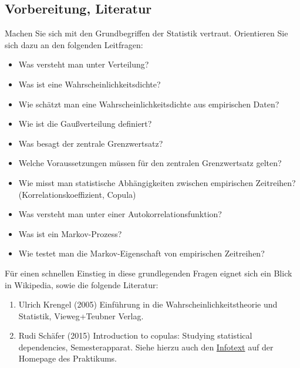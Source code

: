 \documentclass[a4paper,10pt]{article}
\begin{document}



\subsection{Vorbereitung, Literatur}

Machen Sie sich mit den Grundbegriffen der Statistik vertraut. 
Orientieren Sie sich dazu an den folgenden Leitfragen:
\begin{itemize}
\item Was versteht man unter Verteilung? 
\item Was ist eine Wahrscheinlichkeitsdichte?
\item Wie schätzt man eine Wahrscheinlichkeitsdichte aus empirischen Daten?
\item Wie ist die Gaußverteilung definiert?
\item Was besagt der zentrale Grenzwertsatz? 
\item Welche Voraussetzungen müssen für den zentralen Grenzwertsatz gelten?
\item Wie misst man statistische Abhängigkeiten zwischen empirischen Zeitreihen?
      (Korrelationskoeffizient, Copula)
\item Was versteht man unter einer Autokorrelationsfunktion?
\item Was ist ein Markov-Prozess?
\item Wie testet man die Markov-Eigenschaft von empirischen Zeitreihen?
\end{itemize}

\vspace*{1cm}
Für einen schnellen Einstieg in diese grundlegenden Fragen eignet sich ein Blick in Wikipedia, sowie die folgende Literatur:

\begin{enumerate}
\item Ulrich Krengel (2005) Einführung in die Wahrscheinlichkeitstheorie und Statistik, Vieweg+Teubner Verlag.
\item Rudi Schäfer (2015) Introduction to copulas: Studying statistical dependencies, Semesterapparat. Siehe hierzu auch den \href{https://aglorke.uni-due.de/fp2/info/For\%20experiment\%201.12\%20-\%20introduction_to_copulas.pdf}{Infotext} auf der Homepage des Praktikums.

\end{enumerate}
\end{document}
